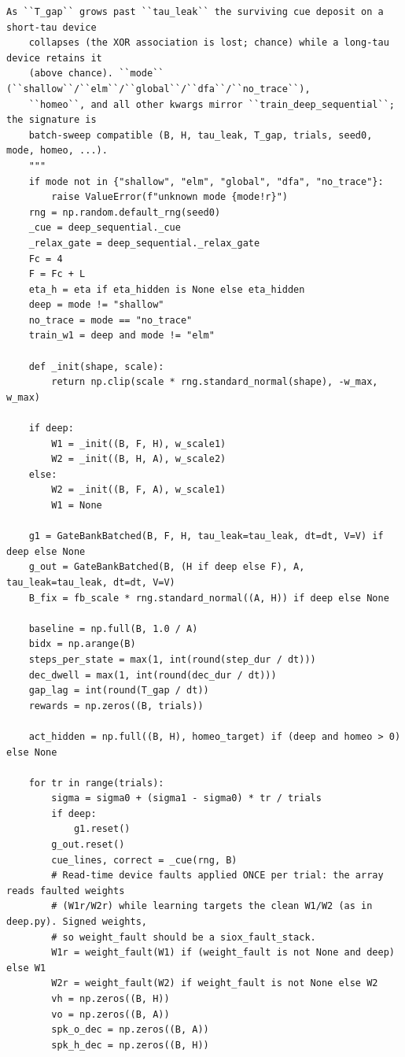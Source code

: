 \begin{lstlisting}[caption={mrl\_trace/distal\_cue.py},label={lst:siox-src-distal_cue}]
    As ``T_gap`` grows past ``tau_leak`` the surviving cue deposit on a short-tau device
    collapses (the XOR association is lost; chance) while a long-tau device retains it
    (above chance). ``mode`` (``shallow``/``elm``/``global``/``dfa``/``no_trace``),
    ``homeo``, and all other kwargs mirror ``train_deep_sequential``; the signature is
    batch-sweep compatible (B, H, tau_leak, T_gap, trials, seed0, mode, homeo, ...).
    """
    if mode not in {"shallow", "elm", "global", "dfa", "no_trace"}:
        raise ValueError(f"unknown mode {mode!r}")
    rng = np.random.default_rng(seed0)
    _cue = deep_sequential._cue
    _relax_gate = deep_sequential._relax_gate
    Fc = 4
    F = Fc + L
    eta_h = eta if eta_hidden is None else eta_hidden
    deep = mode != "shallow"
    no_trace = mode == "no_trace"
    train_w1 = deep and mode != "elm"

    def _init(shape, scale):
        return np.clip(scale * rng.standard_normal(shape), -w_max, w_max)

    if deep:
        W1 = _init((B, F, H), w_scale1)
        W2 = _init((B, H, A), w_scale2)
    else:
        W2 = _init((B, F, A), w_scale1)
        W1 = None

    g1 = GateBankBatched(B, F, H, tau_leak=tau_leak, dt=dt, V=V) if deep else None
    g_out = GateBankBatched(B, (H if deep else F), A, tau_leak=tau_leak, dt=dt, V=V)
    B_fix = fb_scale * rng.standard_normal((A, H)) if deep else None

    baseline = np.full(B, 1.0 / A)
    bidx = np.arange(B)
    steps_per_state = max(1, int(round(step_dur / dt)))
    dec_dwell = max(1, int(round(dec_dur / dt)))
    gap_lag = int(round(T_gap / dt))
    rewards = np.zeros((B, trials))

    act_hidden = np.full((B, H), homeo_target) if (deep and homeo > 0) else None

    for tr in range(trials):
        sigma = sigma0 + (sigma1 - sigma0) * tr / trials
        if deep:
            g1.reset()
        g_out.reset()
        cue_lines, correct = _cue(rng, B)
        # Read-time device faults applied ONCE per trial: the array reads faulted weights
        # (W1r/W2r) while learning targets the clean W1/W2 (as in deep.py). Signed weights,
        # so weight_fault should be a siox_fault_stack.
        W1r = weight_fault(W1) if (weight_fault is not None and deep) else W1
        W2r = weight_fault(W2) if weight_fault is not None else W2
        vh = np.zeros((B, H))
        vo = np.zeros((B, A))
        spk_o_dec = np.zeros((B, A))
        spk_h_dec = np.zeros((B, H))


\end{lstlisting}
